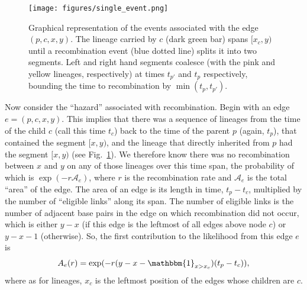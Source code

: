 \documentclass{article}
\begin{document}
\begin{figure}
    \centering
    \texttt{[image: figures/single\_event.png]}
    \caption{
    Graphical representation of the events associated with the edge $(p,c,x,y)$.
    The lineage carried by $c$ (dark green bar) spans $[x_c,y)$
    until a recombination event (blue
    dotted line) splits it into two segments. Left and right hand segments coalesce
    (with the pink and yellow lineages, respectively)
    at times $t_{p'}$ and $t_p$ respectively, bounding the time to recombination by
    $\min(t_p, t_{p'})$.
    \label{fig:likelihood}
    }
\end{figure}

Now consider the ``hazard'' associated with recombination.
Begin with an edge $e = (p,c,x,y)$.
This implies that there was a sequence of lineages
from the time of the child $c$ (call this time $t_c$)
back to the time of the parent $p$ (again, $t_p$),
that contained the segment $[x,y)$,
and the lineage that directly inherited from $p$
had the segment $[x,y)$ (see Fig.~\ref{fig:likelihood}).
We therefore know there was no recombination between $x$ and $y$
on any of those lineages
over this time span,
the probability of which is
$\exp(-r \mathcal{A}_e)$, where $r$ is the recombination rate
and $\mathcal{A}_e$ is the total ``area'' 
of the edge.
The area of an edge is its  length in time, $t_p - t_c$,
multiplied by the number of ``eligible links'' along its
span.
The number of eligible links is the number of adjacent base pairs in the edge
on which recombination did not occur, which is either $y-x$
(if this edge is the leftmost of all edges above node $c$)
or $y-x-1$ (otherwise).
So, the first contribution to the likelihood from this edge $e$ is
\begin{equation}\label{eq:span}
A_e(r) = \exp(-r (y-x - \mathbbm{1}_{x > x_c})(t_p - t_{c})) ,
\end{equation}
where as for lineages, $x_c$ is the leftmost position of the edges whose children are $c$.
\end{document}
